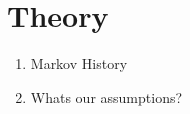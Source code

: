 \section{Theory}

\begin{enumerate}
	\item Markov History 	
	\item Whats our assumptions?
\end{enumerate}
